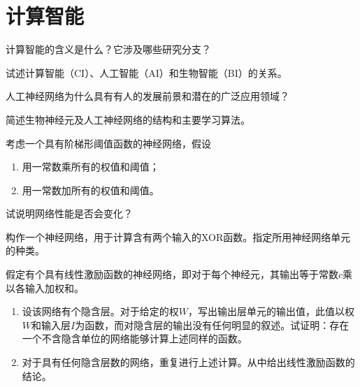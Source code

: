 \chapter{计算智能}

\begin{question}
计算智能的含义是什么？它涉及哪些研究分支？
\end{question}
\begin{solution}
\end{solution}

\begin{question}
试述计算智能（CI）、人工智能（AI）和生物智能（BI）的关系。
\end{question}
\begin{solution}
\end{solution}

\begin{question}
人工神经网络为什么具有有人的发展前景和潜在的广泛应用领域？
\end{question}
\begin{solution}
\end{solution}

\begin{question}
简述生物神经元及人工神经网络的结构和主要学习算法。
\end{question}
\begin{solution}
\end{solution}

\begin{question}
考虑一个具有阶梯形阈值函数的神经网络，假设
	\begin{enumerate}
		\item 用一常数乘所有的权值和阈值；
		\item 用一常数加所有的权值和阈值。
	\end{enumerate}
试说明网络性能是否会变化？
\end{question}
\begin{solution}
\end{solution}

\begin{question}
构作一个神经网络，用于计算含有两个输入的XOR函数。指定所用神经网络单元的种类。
\end{question}
\begin{solution}
\end{solution}

\begin{question}
假定有个具有线性激励函数的神经网络，即对于每个神经元，其输出等于常数$c$乘以各输入加权和。
	\begin{enumerate}
		\item 设该网络有个隐含层。对于给定的权$W$，写出输出层单元的输出值，此值以权$W$和输入层$I$为函数，而对隐含层的输出没有任何明显的叙述。试证明：存在一个不含隐含单位的网络能够计算上述同样的函数。
		\item 对于具有任何隐含层数的网络，重复进行上述计算。从中给出线性激励函数的结论。
	\end{enumerate}
\end{question}
\begin{solution}
\end{solution}

